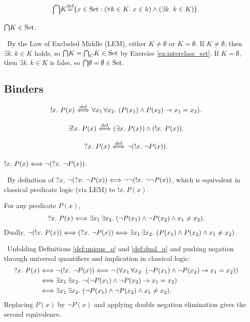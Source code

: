 \documentclass[10pt,a4paper]{article}
\begin{document}
\begin{definition}
$${\bigcap} K {\stackrel{{\textrm{def}}}{=}} \{x \in {\textrm{Set}} : (\forall k\in K.\ x\in k)\land (\exists k.\ k\in K)\}.$$
\end{definition}

\begin{exercise}
${\bigcap} K \in {\textrm{Set}}$.
\end{exercise}
\myprf\ By the Law of Excluded Middle (LEM), either $K \neq \emptyset$ or $K = \emptyset$. If $K \neq \emptyset$, then $\exists k.\ k \in K$ holds, so ${\bigcap} K = {{\bigcap}_C} K \in {\textrm{Set}}$ by Exercise \ref{ex:interclass_set}. If $K = \emptyset$, then $\exists k.\ k \in K$ is false, so ${\bigcap} \emptyset = \emptyset \in {\textrm{Set}}$. \myqed

\subsection{Binders}
\begin{definition}\label{def:unique_q}
$$!x.\ P(x) \propdef \forall x_1\, \forall x_2.\ (P(x_1)\land P(x_2)\to x_1=x_2).$$
\end{definition}

\begin{definition}
$$\exists !x.\ P(x) \propdef (\exists x.\ P(x))\land(!x.\ P(x)).$$
\end{definition}

\begin{definition}\label{def:dual_q}
$$?x.\ P(x) {\stackrel{{\textrm{def}}}{\ \Longleftrightarrow\ }} \neg (!x.\ \neg P(x)).$$
\end{definition}

\begin{exercise}
$!x.\ P(x) \Longleftrightarrow \neg (?x.\ \neg P(x))$.
\end{exercise}
\myprf\ By definition of $?x$, $\neg (?x.\ \neg P(x)) \LRA \neg \neg (!x.\ \neg \neg P(x))$, which is equivalent in classical predicate logic (via LEM) to $!x.\ P(x)$. \myqed

\begin{lemma}
For any predicate $P(x)$,
$$?x.\ P(x) \LRA \exists x_1\, \exists x_2.\ (\neg P(x_1) \land \neg P(x_2) \land x_1 \neq x_2).$$
Dually, $\neg (!x.\ P(x)) \Longleftrightarrow (?x.\ \neg P(x)) \Longleftrightarrow \exists x_1\, \exists x_2.\ (P(x_1) \land P(x_2) \land x_1 \neq x_2)$.
\end{lemma}
\myprf\ Unfolding Definitions \ref{def:unique_q} and \ref{def:dual_q} and pushing negation through universal quantifiers and implication in classical logic:
\begin{align*}
?x.\ P(x) &\Longleftrightarrow \neg (!x.\ \neg P(x)) \Longleftrightarrow \neg \left(\forall x_1\, \forall x_2.\ (\neg P(x_1) \land \neg P(x_2) \to x_1 = x_2)\right) \\
&\Longleftrightarrow \exists x_1\, \exists x_2.\ \neg (\neg P(x_1) \land \neg P(x_2) \to x_1 = x_2) \\
&\Longleftrightarrow \exists x_1\, \exists x_2.\ (\neg P(x_1) \land \neg P(x_2) \land x_1 \neq x_2).
\end{align*}
Replacing $P(x)$ by $\neg P(x)$ and applying double negation elimination gives the second equivalence. \myqed
\end{document}

